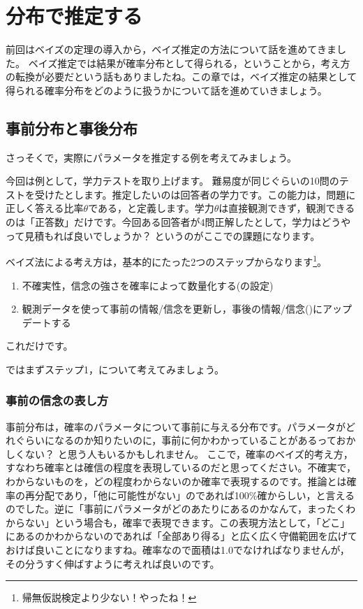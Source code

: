 \documentclass{ltjbook}
\begin{document}
\VerbatimFootnotes

\chapter{分布で推定する}
\label{ch26_bayesian_approach}
前回はベイズの定理の導入から，ベイズ推定の方法について話を進めてきました。
ベイズ推定では結果が確率分布として得られる，ということから，考え方の転換が必要だという話もありましたね。この章では，ベイズ推定の結果として得られる確率分布をどのように扱うかについて話を進めていきましょう。

\section{事前分布と事後分布}
さっそくで，実際にパラメータを推定する例を考えてみましょう。

今回は例として，学力テストを取り上げます。
難易度が同じぐらいの10問のテストを受けたとします。推定したいのは回答者の学力です。この能力は，問題に正しく答える比率$\theta$である，と定義します。学力$\theta$は直接観測できず，観測できるのは「正答数」だけです。今回ある回答者が4問正解したとして，学力はどうやって見積もれば良いでしょうか？ というのがここでの課題になります。

ベイズ法による考え方は，基本的にたった2つのステップからなります\footnote{帰無仮説検定より少ない！やったね！}。
\begin{enumerate}
	\item 不確実性，信念の強さを確率によって数量化する(の設定)
	\item 観測データを使って事前の情報/信念を更新し，事後の情報/信念()にアップデートする
\end{enumerate}
これだけです。

ではまずステップ1，について考えてみましょう。
\subsection{事前の信念の表し方}
事前分布は，確率のパラメータについて事前に与える分布です。パラメータがどれぐらいになるのか知りたいのに，事前に何かわかっていることがあるっておかしくない？ と思う人もいるかもしれません。
ここで，確率のベイズ的考え方，すなわち確率とは確信の程度を表現しているのだと思ってください。不確実で，わからないものを，どの程度わからないのか確率で表現するのです。推論とは確率の再分配であり，「他に可能性がない」のであれば100\%確からしい，と言えるのでした。逆に「事前にパラメータがどのあたりにあるのかなんて，まったくわからない」という場合も，確率で表現できます。この表現方法として，「どこ」にあるのかわからないのであれば「全部あり得る」と広く広く守備範囲を広げておけば良いことになりますね。確率なので面積は1.0でなければなりませんが，その分うすく伸ばすように考えれば良いのです。
\end{document}
